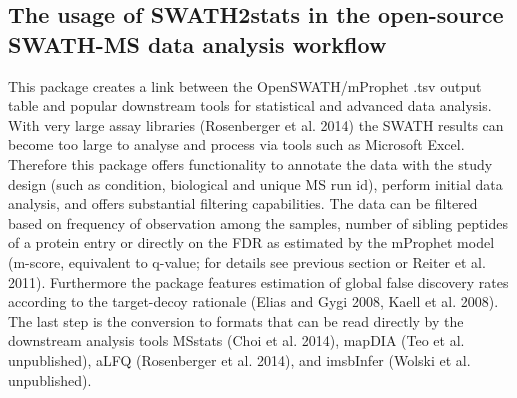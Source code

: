 \documentclass[a4paper]{article}
\begin{document}
\subsection{The usage of SWATH2stats in the open-source SWATH-MS data analysis workflow}
This package creates a link between the OpenSWATH/mProphet .tsv output table and popular downstream tools for statistical and advanced data analysis. With very large assay libraries (Rosenberger et al. 2014) the SWATH results can become too large to analyse and process via tools such as Microsoft Excel. Therefore this package offers functionality to annotate the data with the study design (such as condition, biological and unique MS run id), perform initial data analysis, and offers substantial filtering capabilities. The data can be filtered based on frequency of observation among the samples, number of sibling peptides of a protein entry or directly on the FDR as estimated by the mProphet model (m-score, equivalent to q-value; for details see previous section or Reiter et al. 2011). Furthermore the package features estimation of global false discovery rates according to the target-decoy rationale (Elias and Gygi 2008, Kaell et al. 2008). The last step is the conversion to formats that can be read directly by the downstream analysis tools MSstats (Choi et al. 2014), mapDIA (Teo et al. unpublished), aLFQ (Rosenberger et al. 2014),  and imsbInfer (Wolski et al. unpublished).
\end{document}
